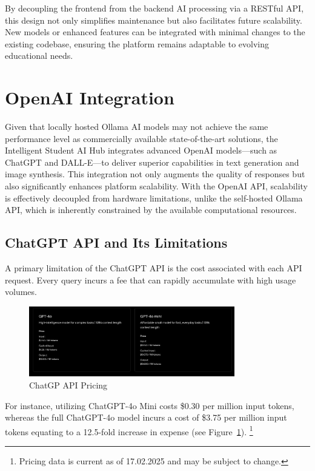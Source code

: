 By decoupling the frontend from the backend AI processing via a RESTful API, this design not only simplifies maintenance but also facilitates future scalability. New models or enhanced features can be integrated with minimal changes to the existing codebase, ensuring the platform remains adaptable to evolving educational needs.


\section{OpenAI Integration}

Given that locally hosted Ollama AI models may not achieve the same performance level as commercially available state-of-the-art solutions, 
the Intelligent Student AI Hub integrates advanced OpenAI models—such as ChatGPT and DALL-E—to deliver superior capabilities in text generation and image synthesis. 
This integration not only augments the quality of responses but also significantly enhances platform scalability. With the OpenAI API, 
scalability is effectively decoupled from hardware limitations, unlike the self-hosted Ollama API, which is inherently constrained by the available computational 
resources.

\subsection{ChatGPT API and Its Limitations}

A primary limitation of the ChatGPT API is the cost associated with each API request. 
Every query incurs a fee that can rapidly accumulate with high usage volumes. 

\begin{figure}[H]
    \centering
    \includegraphics[width=0.8\textwidth]{figures/ChatGPT-API_Pricing.png}
    \caption{ChatGP API Pricing}
    \label{fig:chatgpt_api_integration}
\end{figure}

\cite{ChatGPT-API-Pricing}

For instance, utilizing ChatGPT-4o Mini costs \$0.30 per million input tokens, 
whereas the full ChatGPT-4o model incurs a cost of \$3.75 per million input tokens equating to a 12.5-fold increase in expense 
(see Figure~\ref{fig:chatgpt_api_integration}).
\footnote{Pricing data is current as of 17.02.2025 and may be subject to change.} 

